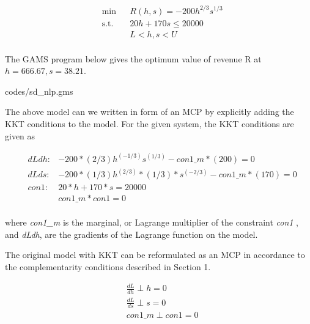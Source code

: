 \documentclass{article}
\begin{document}
\begin{equation}
\begin{aligned}
&	\min
& & R(h,s) = - 200 h^{2/3}s^{1/3}  \\
& \text{s.t.} & & 	 20h + 170s \leq 20000 \\
& & &			L< h,s < U   \\
\end{aligned}
\end{equation}

The GAMS program below gives the optimum value of revenue R at $h = 666.67 , s = 38.21$.

 {codes/sd_nlp.gms}

\noindent The above model can we written in form of an MCP by explicitly adding the KKT conditions to the model. For the given system, the KKT conditions are given as

\begin{equation}
\begin{aligned}
& dLdh : & - 200* (2/3) h^{(-1/3)}  s^{(1/3)} - con1\_m*(200) = 0 	 \\
& dLds:  & - 200 * (1 / 3) h^{(2/3)} *(1/3) *  s^{(-2/3)} - con1\_m*(170)    = 0 	\\
& con1 :   & 20*h + 170 * s = 20000 \\ 
&  & con1\_m *con1 = 0 \\
\end{aligned}
\end{equation}

\noindent where \textit{con1\_m} is the marginal, or Lagrange multiplier of the constraint \textit{con1} , and \textit{dLdh}, are the gradients of the Lagrange function on the model. 

The original model with KKT  can be reformulated as an MCP in accordance to the complementarity conditions described in Section 1. 

\begin{equation}
\begin{aligned}
&  \frac{dL}{dh} \perp h = 0 	 \\
& \frac{dL}{ds} \perp s = 0 	\\
& con1\_m \perp con1 = 0 \\
\end{aligned}
\end{equation}
\end{document}

